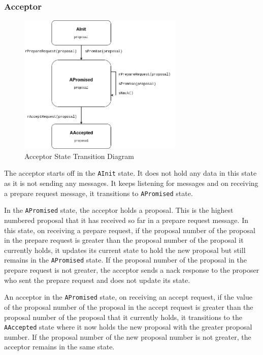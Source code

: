 \subsubsection{Acceptor}
\begin{figure}
\centering
\includegraphics[width=0.7\textwidth]{figures/acceptor_state_transitions.png}
\caption{Acceptor State Transition Diagram
\label{fig:myInlineFigure}}
\end{figure}

The acceptor starts off in the \texttt{AInit} state. It does not hold any data
in this state as it is not sending any messages. It keeps listening for messages
and on receiving a prepare request message, it transitions to \texttt{APromised}
state.

In the \texttt{APromised} state, the acceptor holds a proposal. This is
the highest numbered proposal that it has received so far in a prepare request
message. In this state, on receiving a prepare request, if the proposal number
of the proposal in the prepare request is greater than the proposal number of
the proposal it currently holds, it updates its current state to hold the new
proposal but still remains in the \texttt{APromised} state. If the proposal
number of the proposal in the prepare request is not greater, the acceptor
sends a nack response to the proposer who sent the prepare request and does not
update its state.

An acceptor in the \texttt{APromised} state, on receiving an accept request, if
the value of the proposal number of the proposal in the accept request is greater than
the proposal number of the proposal that it currently holds, it transitions to the
\texttt{AAccepted} state where it now holds the new proposal with the greater
proposal number. If the proposal number of the new proposal number is not greater,
the acceptor remains in the same state.

